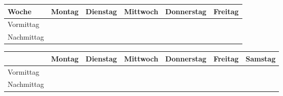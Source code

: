 \documentclass[landscape]{article}
\theoremstyle{definition} %
\begin{document}
  \begin{center}
    \begin{tabular}{|p{2.5cm}|p{3.5cm}|p{3.5cm}|p{3.5cm}|p{3.5cm}|p{3.5cm}|} 
      \hline
      Woche & Montag & Dienstag & Mittwoch & Donnerstag & Freitag \\ [3ex]
      \hline
      Vormittag & & & & & \\ [40ex]
      \hline
      Nachmittag & & & & & \\ [40ex]
      \hline
    \end{tabular}
  \end{center}
  \begin{center}
    \begin{tabular}{|p{3cm}|p{3cm}|p{3cm}|p{3cm}|p{3cm}|p{3cm}|p{3cm}|} 
      \hline
      & Montag & Dienstag & Mittwoch & Donnerstag & Freitag & Samstag \\ [3ex]
      \hline
      Vormittag & & & & & & \\ [40ex]
      \hline
      Nachmittag & & & & & & \\ [40ex]
      \hline
    \end{tabular}
  \end{center}
\end{document}
